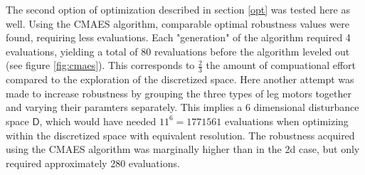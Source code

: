     The second option of optimization described in section \ref{opt} was tested here as well. Using the CMAES algorithm, comparable optimal robustness values were found, requiring less evaluations. Each "generation" of the algorithm required 4 evaluations, yielding a total of 80 revaluations before the algorithm leveled out (see figure \ref{fig:cmaes}). This corresponds to $\frac{2}{3}$ the amount of compuational effort compared to the exploration of the discretized space. 
    Here another attempt was made to increase robustness by grouping the three types of leg motors together and varying their paramters separately. This implies a 6 dimensional disturbance space $\mathsf{D}$, which would have needed $11^6=1771561$ evaluations when optimizing within the discretized space with equivalent resolution. The robustness acquired using the CMAES algorithm was marginally higher than in the 2d case, but only required approximately 280 evaluations.  


































